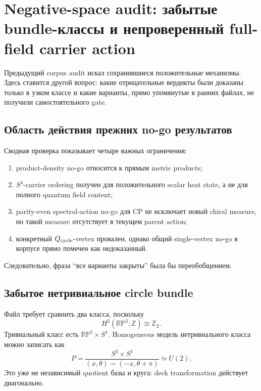 \chapter{Negative-space audit: забытые bundle-классы и непроверенный full-field carrier action}

Предыдущий corpus audit искал сохранившиеся положительные механизмы. Здесь
ставится другой вопрос: какие отрицательные вердикты были доказаны только в
узком классе и какие варианты, прямо упомянутые в ранних файлах, не получили
самостоятельного gate.

\section{Область действия прежних no-go результатов}

Сводная проверка показывает четыре важных ограничения:
\begin{enumerate}
 \item product-density no-go относится к прямым metric products;
 \item \(S^4\)-carrier ordering получен для положительного scalar heat
 state, а не для полного quantum field content;
 \item parity-even spectral-action no-go для CP не исключает новый chiral
 measure, но такой measure отсутствует в текущем parent action;
 \item конкретный \(Q_{\rm cycle}\)-vertex провален, однако общий
 single-vertex no-go в корпусе прямо помечен как недоказанный.
\end{enumerate}
Следовательно, фраза ``все варианты закрыты'' была бы переобобщением.

\section{Забытое нетривиальное circle bundle}

Файл
 требует
сравнить два класса, поскольку
\begin{equation}
 H^2(\mathbb{RP}^3;\mathbb Z)\cong\mathbb Z_2.
\end{equation}
Тривиальный класс есть \(\mathbb{RP}^3\times S^1\). Homogeneous модель
нетривиального класса можно записать как
\begin{equation}
 P=\frac{S^3\times S^1}
 {(x,\theta)\sim(-x,\theta+\pi)}
 \simeq U(2).
 \label{eq:nontrivial-circle-bundle-u2}
\end{equation}
Это уже не независимый quotient базы и круга: deck transformation действует
диагонально.

